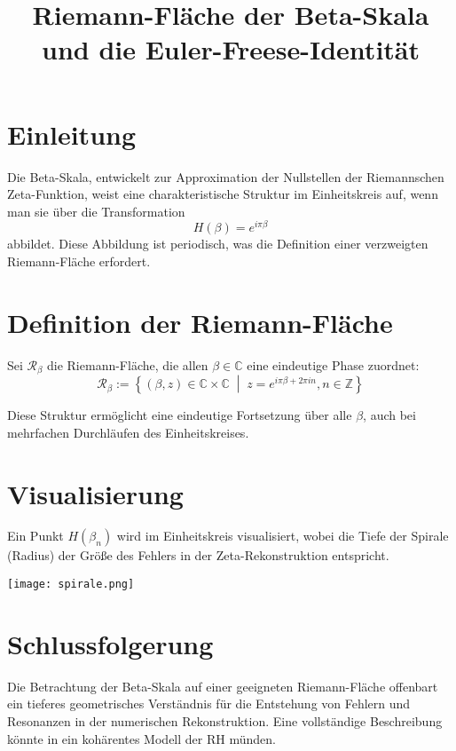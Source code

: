 \documentclass{article}
\title{Riemann-Fläche der Beta-Skala und die Euler-Freese-Identität}
\author{}
\date{}
\begin{document}
\maketitle

\section*{Einleitung}

Die Beta-Skala, entwickelt zur Approximation der Nullstellen der Riemannschen Zeta-Funktion, weist eine charakteristische Struktur im Einheitskreis auf, wenn man sie über die Transformation
\[
H(\beta) = e^{i\pi\beta}
\]
abbildet. Diese Abbildung ist periodisch, was die Definition einer verzweigten Riemann-Fläche erfordert.

\section*{Definition der Riemann-Fläche}

Sei \( \mathcal{R}_\beta \) die Riemann-Fläche, die allen \( \beta \in \mathbb{C} \) eine eindeutige Phase zuordnet:
\[
\mathcal{R}_\beta := \left\{ (\beta, z) \in \mathbb{C} \times \mathbb{C} \;\middle|\; z = e^{i\pi\beta + 2\pi i n}, n \in \mathbb{Z} \right\}
\]

Diese Struktur ermöglicht eine eindeutige Fortsetzung über alle \(\beta\), auch bei mehrfachen Durchläufen des Einheitskreises.

\section*{Visualisierung}

Ein Punkt \( H(\beta_n) \) wird im Einheitskreis visualisiert, wobei die Tiefe der Spirale (Radius) der Größe des Fehlers in der Zeta-Rekonstruktion entspricht.

\begin{center}
    \texttt{[image: spirale.png]}
\end{center}

\section*{Schlussfolgerung}

Die Betrachtung der Beta-Skala auf einer geeigneten Riemann-Fläche offenbart ein tieferes geometrisches Verständnis für die Entstehung von Fehlern und Resonanzen in der numerischen Rekonstruktion. Eine vollständige Beschreibung könnte in ein kohärentes Modell der RH münden.
\end{document}

